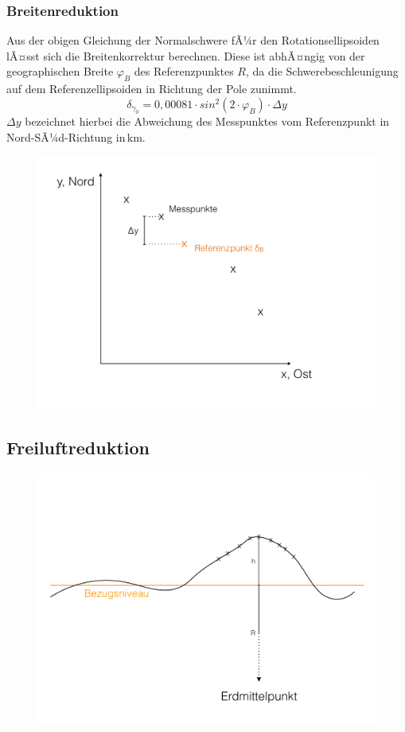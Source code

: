 \subsubsection{Breitenreduktion} 
Aus der obigen Gleichung der Normalschwere fÃ¼r den Rotationsellipsoiden lÃ¤sst sich die Breitenkorrektur berechnen. Diese ist abhÃ¤ngig von der geographischen Breite $\varphi_B$ des Referenzpunktes $R$, da die Schwerebeschleunigung auf dem Referenzellipsoiden in Richtung der Pole zunimmt. \begin{equation*}
	\delta_{\gamma_0} = 0,00081 \cdot sin^2(2 \cdot \varphi_B) \cdot \Delta y
\end{equation*}
$\Delta y$ bezeichnet hierbei die Abweichung des Messpunktes vom Referenzpunkt in Nord-SÃ¼d-Richtung in\,km. 

\begin{figure}[H]
	\centering
	\includegraphics[scale = 0.3]{GravimetrieBilder/Breitenreduktion}
\end{figure}

\subsection{Freiluftreduktion}

\begin{figure}[H]
	\centering
	\includegraphics[width = \textwidth]{GravimetrieBilder/Freiluftreduktion}
\end{figure}

